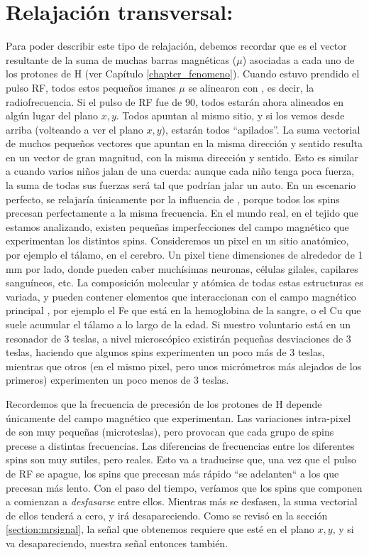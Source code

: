 \section{Relajación transversal: \Ttwo}
Para poder describir este tipo de relajación, debemos recordar que \M es el vector resultante de la suma de muchas barras magnéticas ($\mu$) asociadas a cada uno de los protones de H (ver Capítulo \ref{chapter_fenomeno}). Cuando estuvo prendido el pulso RF, todos estos pequeños imanes $\mu$ se alinearon con \Bone, es decir, la radiofrecuencia. Si el pulso de RF fue de 90\degrees, todos estarán ahora alineados en algún lugar del plano $x,y$. Todos apuntan al mismo sitio, y si los vemos desde arriba (volteando a ver el plano $x,y$), estarán todos ``apilados''. La suma vectorial de muchos pequeños vectores que apuntan en la misma dirección y sentido resulta en un vector de gran magnitud, con la misma dirección y sentido. Esto es similar a cuando varios niños jalan de una cuerda: aunque cada niño tenga poca fuerza, la suma de todas sus fuerzas será tal que podrían jalar un auto. En un escenario perfecto, \M se relajaría únicamente por la influencia de \Tone, porque todos los spins precesan perfectamente a la misma frecuencia. En el mundo real, en el tejido que estamos analizando, existen pequeñas imperfecciones del campo magnético que experimentan los distintos spins. Consideremos un pixel en un sitio anatómico, por ejemplo el tálamo, en el cerebro. Un pixel tiene dimensiones de alrededor de 1 mm por lado, donde pueden caber muchísimas neuronas, células gilales, capilares sanguíneos, etc. La composición molecular y atómica de todas estas estructuras es variada, y pueden contener elementos que interaccionan con el campo magnético principal \Bzero, por ejemplo el Fe que está en la hemoglobina de la sangre, o el Cu que suele acumular el tálamo a lo largo de la edad. Si nuestro voluntario está en un resonador de 3 teslas, a nivel microscópico existirán pequeñas desviaciones de 3 teslas, haciendo que algunos spins experimenten un poco más de 3 teslas, mientras que otros (en el mismo pixel, pero unos micrómetros más alejados de los primeros) experimenten un poco menos de 3 teslas. 



Recordemos que la frecuencia de precesión \omegazero de los protones de H depende únicamente del campo magnético \Bzero que experimentan. Las variaciones intra-pixel de \Bzero son muy pequeñas (microteslas), pero provocan que cada grupo de spins precese a distintas frecuencias. Las diferencias de frecuencias entre los diferentes spins son muy sutiles, pero reales. Esto va a traducirse que, una vez que el pulso de RF se apague, los spins que precesan más rápido ``se adelanten`` a los que precesan más lento. Con el paso del tiempo, veríamos que los spins que componen a \M comienzan a \textit{desfasarse} entre ellos. Mientras más se desfasen, la suma vectorial de ellos tenderá a cero, y \M irá desapareciendo. Como se revisó en la sección \ref{section:mrsignal}, la señal que obtenemos requiere que \M esté en el plano $x,y$, y si \M va desapareciendo, nuestra señal entonces también.

